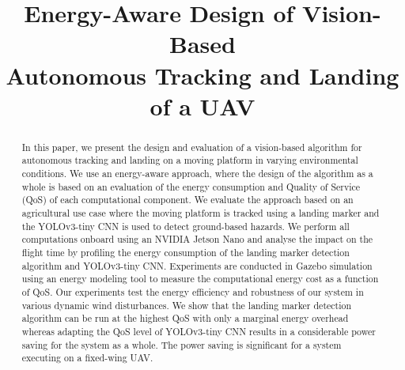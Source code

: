 \documentclass[conference]{IEEEtran}
\begin{document}
\title{Energy-Aware Design of Vision-Based\\Autonomous Tracking and Landing of a UAV} 

\author{
}

\maketitle


\begin{abstract}


In this paper, we present the design and evaluation of a
vision-based algorithm for autonomous tracking and landing on a moving platform 
in varying environmental conditions. %
%
We use an energy-aware approach, where the design of the algorithm as a whole is based on
an evaluation of the energy consumption and Quality of Service (QoS) of each computational component.
%
We evaluate the approach based on an agricultural use case where
the moving platform is tracked using 
a landing marker %
and the YOLOv3-tiny CNN is used to detect ground-based hazards. We
perform all computations onboard using an NVIDIA Jetson Nano and analyse the impact on the flight time by profiling the energy consumption of the
landing marker detection algorithm and YOLOv3-tiny CNN. Experiments are conducted in Gazebo simulation using an energy modeling tool to measure the computational energy cost as a function of QoS. Our experiments test the energy efficiency and robustness of our system in various dynamic wind disturbances. We show that the landing marker detection algorithm can be run at the highest QoS with only a marginal energy overhead whereas adapting the QoS level of YOLOv3-tiny CNN results in a considerable power saving for the system as a whole. The
power saving is significant for a system executing on a fixed-wing UAV. %

\end{abstract}

%
\IEEEpeerreviewmaketitle
\end{document}
